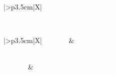 \begin{xltabular}{\textwidth}{|>{\bfseries}p{3.5cm}|X|}
    \caption{CU3: Gestionar Perfil}
    \label{tab:esp_cu3} \\
    
\end{xltabular}
\endgroup

\newpage

\begingroup
\small 
\renewcommand{\arraystretch}{1.4}
\begin{xltabular}{\textwidth}{|>{\bfseries}p{3.5cm}|X|}
    \textcolor{white}{Campo} & \textcolor{white}{Descripción} \\ \hline
    \endfirsthead

     \\
    \hline
    \textcolor{white}{Campo} & \textcolor{white}{Descripción} \\ \hline
    \endhead



\end{xltabular}

